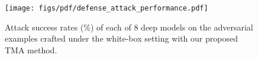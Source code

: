 \begin{figure}[htbp]
    \centering
    \texttt{[image: figs/pdf/defense\_attack\_performance.pdf]}
    \caption{Attack success rates (\%) of each of $8$ deep models on the adversarial examples crafted under the white-box setting with our proposed TMA method. }
    \label{fig:defense}
\end{figure}
